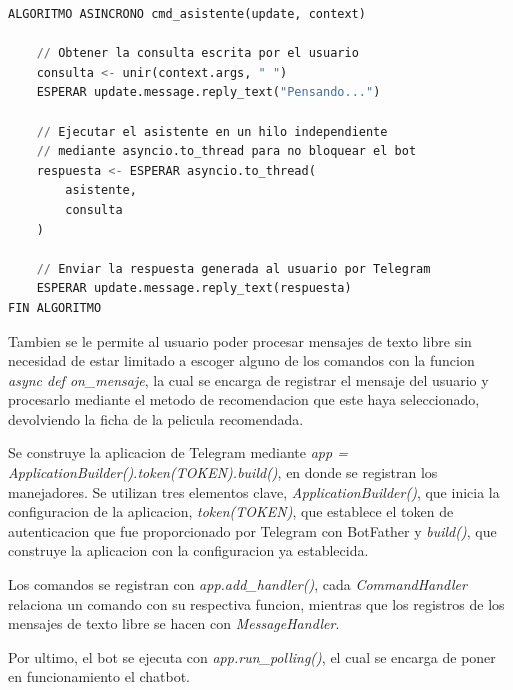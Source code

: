\begin{lstlisting}[language=Python, caption={~}]
ALGORITMO ASINCRONO cmd_asistente(update, context)

    // Obtener la consulta escrita por el usuario
    consulta <- unir(context.args, " ")
    ESPERAR update.message.reply_text("Pensando...")

    // Ejecutar el asistente en un hilo independiente
    // mediante asyncio.to_thread para no bloquear el bot
    respuesta <- ESPERAR asyncio.to_thread(
        asistente,
        consulta
    )

    // Enviar la respuesta generada al usuario por Telegram
    ESPERAR update.message.reply_text(respuesta)
FIN ALGORITMO
\end{lstlisting}

Tambien se le permite al usuario poder procesar mensajes de texto libre sin necesidad de estar limitado a escoger alguno de los comandos con la funcion \textit{async def on_mensaje}, la cual se encarga de registrar el mensaje del usuario y procesarlo mediante el metodo de recomendacion que este haya seleccionado, devolviendo la ficha de la pelicula recomendada.

Se construye la aplicacion de Telegram mediante \textit{app = ApplicationBuilder().token(TOKEN).build()}, en donde se registran los manejadores. Se utilizan tres elementos clave, \textit{ApplicationBuilder()}, que inicia la configuracion de la aplicacion, \textit{token(TOKEN)}, que establece el token de autenticacion que fue proporcionado por Telegram con BotFather y \textit{build()}, que construye la aplicacion con la configuracion ya establecida.

Los comandos se registran con \textit{app.add_handler()}, cada \textit{CommandHandler} relaciona un comando con su respectiva funcion, mientras que los registros de los mensajes de texto libre se hacen con \textit{MessageHandler}.

Por ultimo, el bot se ejecuta con \textit{app.run\_polling()}, el cual se encarga de poner en funcionamiento el chatbot.